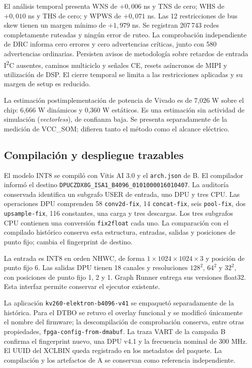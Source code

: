 \documentclass[10pt,conference,a4paper]{elektron}
\begin{document}
El análisis temporal presenta WNS de $+0{,}006$ ns y TNS de cero; WHS de $+0{,}010$ ns y THS de cero; y WPWS de $+0{,}071$ ns. Las 12 restricciones de bus skew tienen un margen mínimo de $+1{,}979$ ns. Se registran 207\,743 redes completamente ruteadas y ningún error de ruteo. La comprobación independiente de DRC informa cero errores y cero advertencias críticas, junto con 580 advertencias ordinarias. Persisten avisos de metodología sobre retardos de entrada I\textsuperscript{2}C ausentes, caminos multiciclo y señales CE, resets asíncronos de MIPI y utilización de DSP. El cierre temporal se limita a las restricciones aplicadas y su margen de setup es reducido.

La estimación postimplementación de potencia de Vivado es de 7,026 W sobre el chip: 6,666 W dinámicos y 0,360 W estáticos. Es una estimación sin actividad de simulación (\emph{vectorless}), de confianza baja. Se presenta separadamente de la medición de VCC\_SOM; difieren tanto el método como el alcance eléctrico.

\subsection{Compilación y despliegue trazables}
El modelo INT8 se compiló con Vitis AI 3.0 y el \texttt{arch.json} de B. El compilador informó el destino \nolinkurl{DPUCZDX8G_ISA1_B4096_0101000016010407}. La auditoría conservada identifica un subgrafo USER de entrada, uno DPU y tres CPU. Las operaciones DPU comprenden 58 \texttt{conv2d-fix}, 14 \texttt{concat-fix}, seis \texttt{pool-fix}, dos \texttt{upsample-fix}, 116 constantes, una carga y tres descargas. Los tres subgrafos CPU contienen una conversión \texttt{fix2float} cada uno. La comparación con el compilado histórico conserva esta estructura, entradas, salidas y posiciones de punto fijo; cambia el fingerprint de destino.

La entrada es INT8 en orden NHWC, de forma $1\times1024\times1024\times3$ y posición de punto fijo 6. Las salidas DPU tienen 18 canales y resoluciones $128^2$, $64^2$ y $32^2$, con posiciones de punto fijo 1, 2 y 1. Graph Runner entrega sus versiones float32. Esta interfaz permite conservar el ejecutor existente.

La aplicación \texttt{kv260-elektron-b4096-v41} se empaquetó separadamente de la histórica. Para el DTBO se retuvo el overlay funcional y se modificó únicamente el nombre del firmware; la descompilación de comprobación conserva, entre otras propiedades, \texttt{fpga-config-from-dmabuf}. La traza VART de la campaña B confirma el fingerprint nuevo, una DPU v4.1 y la frecuencia nominal de 300 MHz. El UUID del XCLBIN queda registrado en los metadatos del paquete. La compilación y los artefactos de A se conservan como referencia independiente.
\end{document}
